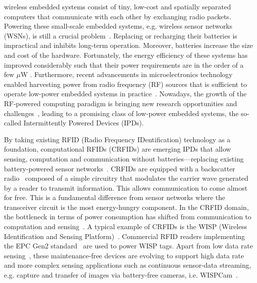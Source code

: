 \documentclass[10pt,journal,compsoc]{IEEEtran}
\begin{document}
\maketitle

\IEEEdisplaynontitleabstractindextext

\IEEEpeerreviewmaketitle




 wireless embedded systems consist of tiny, low-cost and spatially separated computers that communicate with each other by exchanging radio packets. Powering these small-scale embedded systems, e.g. wireless sensor networks (WSNs), is still a crucial problem~\cite{emergence}. Replacing or recharging their batteries is impractical and inhibits long-term operation. Moreover, batteries increase the size and cost of the hardware. Fortunately, the energy efficiency of these systems has improved considerably such that their power requirements are in the order of a few $\mu$W \cite{booksmith2013}. Furthermore, recent advancements in microelectronics technology enabled harvesting power from radio frequency (RF) sources that is sufficient to operate low-power embedded systems in practice~\cite{60ghz,emergence,bi:commag:2015,xie_wcom_2013,garnica_procieee_2013}. Nowadays, the growth of the RF-powered computing paradigm is bringing new research opportunities and challenges~\cite{emergence}, leading to a promising class of low-power embedded systems, the so-called Intermittently Powered Devices (IPDs).

By taking existing RFID (Radio Frequency IDentification) technology as a foundation, computational RFIDs (CRFIDs) are emerging IPDs that allow sensing, computation and communication without batteries---replacing existing battery-powered sensor networks~\cite{booksmith2013}. CRFIDs are equipped with a backscatter radio~\cite[Chapter 4]{rfid_handbook} composed of a simple circuitry that modulates the carrier wave generated by a reader to transmit information. This allows communication to come almost for free. This is a fundamental difference from sensor networks where the transceiver circuit is the most energy-hungry component. In the CRFID domain, the bottleneck in terms of power consumption has shifted from communication to computation and sensing~\cite{ekhonet}. A typical example of CRFIDs is the WISP (Wireless Identification and Sensing Platform)~\cite{wisp}. Commercial RFID readers implementing the EPC Gen2 standard~\cite{epc_gen2} are used to power WISP tags. Apart from low data rate sensing~\cite{neuralWISP}, these maintenance-free devices are evolving to support high data rate and more complex sensing applications such as continuous sensor-data streaming, e.g. capture and transfer of images via battery-free cameras, i.e. WISPCam~\cite{wispcam_2015,cameralocalize_2015}.
\end{document}

